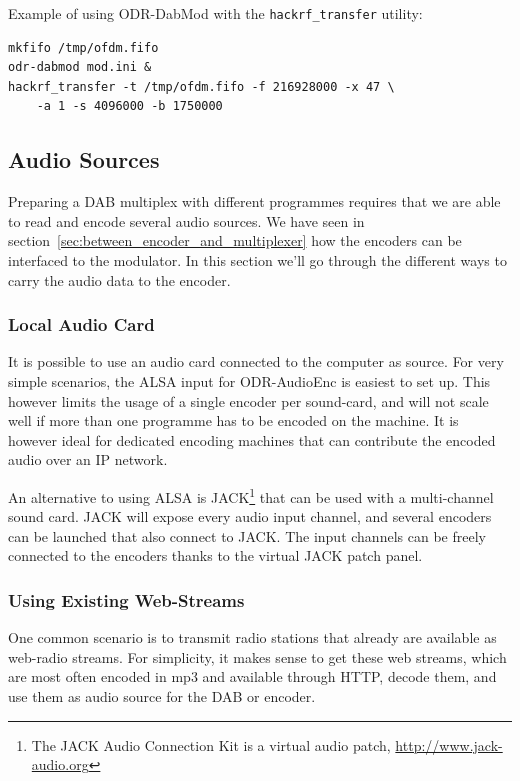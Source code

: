 Example of using ODR-DabMod with the \texttt{hackrf\_transfer} utility:

\begin{lstlisting}
mkfifo /tmp/ofdm.fifo
odr-dabmod mod.ini &
hackrf_transfer -t /tmp/ofdm.fifo -f 216928000 -x 47 \
    -a 1 -s 4096000 -b 1750000
\end{lstlisting}



\subsection{Audio Sources}
Preparing a DAB multiplex with different programmes requires that we are able to
read and encode several audio sources. We have seen in
section~\ref{sec:between_encoder_and_multiplexer} how the encoders can be
interfaced to the modulator. In this section we'll go through the different ways
to carry the audio data to the encoder.

\subsubsection{Local Audio Card}
It is possible to use an audio card connected to the computer as source. For
very simple scenarios, the ALSA input for ODR-AudioEnc is easiest to set up.
This however limits the usage of a single encoder per sound-card, and will not
scale well if more than one programme has to be encoded on the machine. It is
however ideal for dedicated encoding machines that can contribute the encoded
audio over an IP network.

An alternative to using ALSA is JACK\footnote{The JACK Audio Connection Kit is a
    virtual audio patch, \url{http://www.jack-audio.org}}
that can be used with a multi-channel sound card. JACK will expose every audio
input channel, and several encoders can be launched that also connect to JACK.
The input channels can be freely connected to the encoders thanks to the virtual
JACK patch panel.


\subsubsection{Using Existing Web-Streams}
\label{usingexistingwebstreams}
One common scenario is to transmit radio stations that already are available as
web-radio streams. For simplicity, it makes sense to get these web streams,
which are most often encoded in mp3 and available through HTTP, decode them, and
use them as audio source for the DAB or \dabplus encoder.

